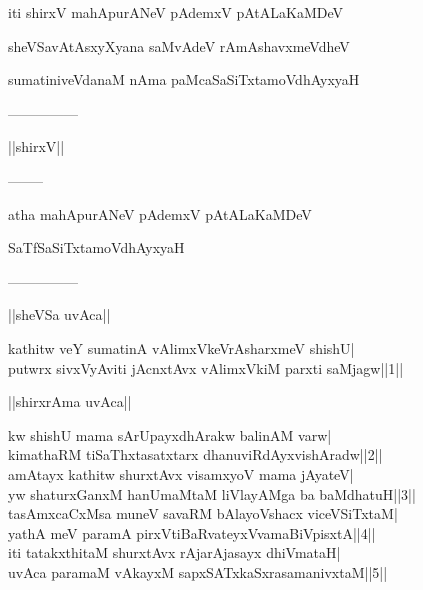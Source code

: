 \documentclass{article}
\begin{document}
\begin{center}
iti shirxV mahApurANeV pAdemxV pAtALaKaMDeV
\end{center}

\begin{center}
sheVSavAtAsxyXyana saMvAdeV rAmAshavxmeVdheV
\end{center}

\begin{center}
sumatiniveVdanaM nAma paMcaSaSiTxtamoVdhAyxyaH
\end{center}

\begin{center}
---------------
\end{center}

\begin{center}
||shirxV||
\end{center}

\begin{center}
--------
\end{center}

\begin{center}
atha mahApurANeV pAdemxV pAtALaKaMDeV
\end{center}

\begin{center}
SaTfSaSiTxtamoVdhAyxyaH
\end{center}

\begin{center}
---------------
\end{center}

\begin{center}
||sheVSa uvAca||
\end{center}

kathitw veY sumatinA vAlimxVkeVrAsharxmeV shishU|\\
putwrx sivxVyAviti jAcnxtAvx vAlimxVkiM parxti saMjagw||1||

\begin{center}
||shirxrAma uvAca||
\end{center}

kw shishU mama sArUpayxdhArakw balinAM varw|\\
kimathaRM tiSaThxtasatxtarx dhanuviRdAyxvishAradw||2||\\
amAtayx kathitw shurxtAvx visamxyoV mama jAyateV|\\
yw shaturxGanxM hanUmaMtaM liVlayAMga ba baMdhatuH||3||\\
tasAmxcaCxMsa muneV savaRM bAlayoVshacx viceVSiTxtaM|\\
yathA meV paramA pirxVtiBaRvateyxVvamaBiVpisxtA||4||\\
iti tatakxthitaM shurxtAvx rAjarAjasayx dhiVmataH|\\
uvAca paramaM vAkayxM sapxSATxkaSxrasamanivxtaM||5||
\end{document}
